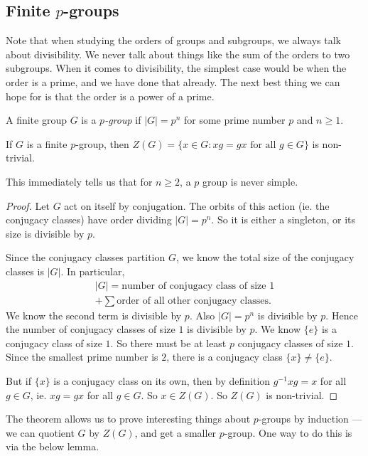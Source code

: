 \documentclass[a4paper]{article}
\begin{document}
\subsection{Finite $p$-groups}
Note that when studying the orders of groups and subgroups, we always talk about divisibility. We never talk about things like the sum of the orders to two subgroups. When it comes to divisibility, the simplest case would be when the order is a prime, and we have done that already. The next best thing we can hope for is that the order is a power of a prime.

\begin{defi}[$p$-group]
  A finite group $G$ is a \emph{$p$-group} if $|G| = p^n$ for some prime number $p$ and $n \geq 1$.
\end{defi}

\begin{thm}
  If $G$ is a finite $p$-group, then $Z(G) = \{x \in G: xg = gx\text{ for all }g \in G\}$ is non-trivial.
\end{thm}
This immediately tells us that for $n \geq 2$, a $p$ group is never simple.

\begin{proof}
  Let $G$ act on itself by conjugation. The orbits of this action (ie. the conjugacy classes) have order dividing $|G| = p^n$. So it is either a singleton, or its size is divisible by $p$.

  Since the conjugacy classes partition $G$, we know the total size of the conjugacy classes is $|G|$. In particular,
  \begin{multline*}
    |G| = \text{number of conjugacy class of size 1} \\
    + \sum \text{order of all other conjugacy classes}.
  \end{multline*}
  We know the second term is divisible by $p$. Also $|G| = p^n$ is divisible by $p$. Hence the number of conjugacy classes of size $1$ is divisible by $p$. We know $\{e\}$ is a conjugacy class of size $1$. So there must be at least $p$ conjugacy classes of size $1$. Since the smallest prime number is $2$, there is a conjugacy class $\{x\} \not= \{e\}$.

  But if $\{x\}$ is a conjugacy class on its own, then by definition $g^{-1}xg = x$ for all $g \in G$, ie. $xg = gx$ for all $g \in G$. So $x \in Z(G)$. So $Z(G)$ is non-trivial.
\end{proof}
The theorem allows us to prove interesting things about $p$-groups by induction --- we can quotient $G$ by $Z(G)$, and get a smaller $p$-group. One way to do this is via the below lemma.
\end{document}
